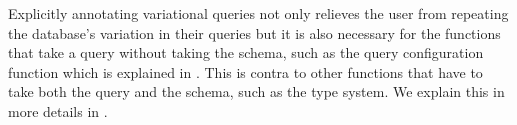 %
Explicitly annotating variational queries not only relieves the user from repeating the
database's variation in their queries but it is also necessary for the functions that 
take a query without taking the schema, such as the query configuration function 
which is explained in .
This is contra to other functions that have to take both the query and the 
schema, such as the type system. 
We explain this in more details in .
%
